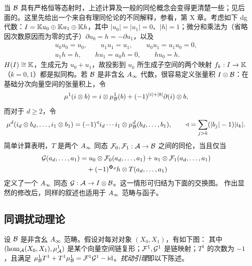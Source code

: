 \begin{note}\label{st:1.11}
当 $\mathcal B$ 具有严格恒等态射时，上述计算及一般的同伦概念会变得更清楚一些；见后面的。这里先给出一个来自有理同伦论的不同解释，参看，第 X 章。考虑如下 dg 代数：$I=\mathbb K u_0\oplus\mathbb K u_1\oplus\mathbb K h$，其中 $|u_0|=|u_1|=0$、$|h|=1$；微分和乘法为（省略因次数原因而为零的式子）$\partial u_0=h=-\partial u_1$，以及
\[
\begin{gathered}
u_0u_0=u_0,\qquad u_1u_1=u_1,\qquad u_0u_1=u_1u_0=0,\\
u_1h=h,\qquad hu_1=u_0h=0,\qquad hu_0=h.
\end{gathered}
\]
$H(I)\cong\mathbb K$，生成元为 $u_0+u_1$，故投影到 $u_k$ 所生成子空间的两个映射 $f_k:I\to\mathbb K$（$k=0,1$）都是拟同构。若 $\mathcal B$ 是非含幺 $A_\infty$ 代数，很容易定义张量积 $I\otimes\mathcal B$：在基础分次向量空间的张量积上，令
\[
\mu^1(i\otimes b)=i\otimes\mu^1_{\mathcal B}(b)+(-1)^{|i|+|b|}\partial(i)\otimes b,
\]
而对于 $d\ge2$，令
\[
\mu^d(i_d\otimes b_d,\ldots,i_1\otimes b_1)
=(-1)^{\triangleleft}i_d\cdots i_1\otimes\mu^d_{\mathcal B}(b_d,\ldots,b_1),
\qquad\triangleleft=\sum_{j>k}(|b_j|-1)|i_k|.
\]
简单计算表明，$T$ 是两个 $A_\infty$ 同态 $\mathcal F_0,\mathcal F_1:\mathcal A\to\mathcal B$ 之间的同伦，当且仅当
\[
\begin{aligned}
\G(a_d,\ldots,a_1)
&=u_0\otimes\F_0(a_d,\ldots,a_1)+u_1\otimes\F_1(a_d,\ldots,a_1)\\
&\quad+(-1)^{\sgnmark_d}h\otimes T(a_d,\ldots,a_1)
\end{aligned}
\]
定义了一个 $A_\infty$ 同态 $\mathcal G:\mathcal A\to I\otimes\mathcal B$。这一情形可归结为下面的交换图。
作出显然的修改后，同样的叙述也适用于 $A_\infty$ 范畴与函子。
\end{note}

\subsection{同调扰动理论}\label{sec:1i}
设 $\mathcal B$ 是非含幺 $A_\infty$ 范畴。假设对每对对象 $(X_0,X_1)$，有如下图：
其中 $(\hom_{\mathcal A}(X_0,X_1),\mu^1_{\mathcal A})$ 是某个向量空间链复形；$\mathcal F^1,\mathcal G^1$ 是链映射；$T^1$ 的次数为 $-1$，且满足 $\mu^1_{\mathcal B}T^1+T^1\mu^1_{\mathcal B}=\mathcal F^1\mathcal G^1-\operatorname{id}$。\emph{扰动引理}即以下陈述。

